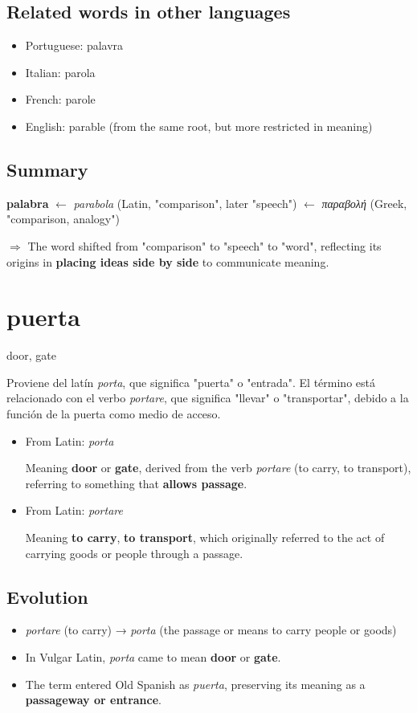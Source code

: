 \documentclass[10pt]{book}
\newcommand{\wordentry}[2]{
	\large #1
	\vspace{-0.5em}
	\begin{etymologybox}
		#2
	\end{etymologybox}
}
\let\oldsection\section
\renewcommand{\section}[1]{
	\needspace{8\baselineskip}
	\oldsection{#1}
}
\begin{document}
	\subsection*{Related words in other languages}
	\begin{itemize}
		\item Portuguese: palavra
		\item Italian: parola
		\item French: parole
		\item English: parable (from the same root, but more restricted in meaning)
	\end{itemize}
	
	\subsection*{Summary}
	\textbf{palabra} $\leftarrow$ \textit{parabola} (Latin, "comparison", later "speech") $\leftarrow$ \textit{παραβολή} (Greek, "comparison, analogy")
	
	$\Rightarrow$ The word shifted from "comparison" to "speech" to "word", reflecting its origins in \textbf{placing ideas side by side} to communicate meaning.
	
	
	\section{puerta}
	\wordentry{door, gate}{
		Proviene del latín \textit{porta}, que significa "puerta" o "entrada". El término está relacionado con el verbo \textit{portare}, que significa "llevar" o "transportar", debido a la función de la puerta como medio de acceso.
		\begin{itemize}
			\item From Latin: \textit{porta}
			
			Meaning \textbf{door} or \textbf{gate}, derived from the verb \textit{portare} (to carry, to transport), referring to something that \textbf{allows passage}.
			
			\item From Latin: \textit{portare}
			
			Meaning \textbf{to carry}, \textbf{to transport}, which originally referred to the act of carrying goods or people through a passage.
		\end{itemize}
	}
	
	\subsection*{Evolution}
	\begin{itemize}
		\item \textit{portare} (to carry) → \textit{porta} (the passage or means to carry people or goods)
		\item In Vulgar Latin, \textit{porta} came to mean \textbf{door} or \textbf{gate}.
		\item The term entered Old Spanish as \textit{puerta}, preserving its meaning as a \textbf{passageway or entrance}.
	\end{itemize}
	
\end{document}
